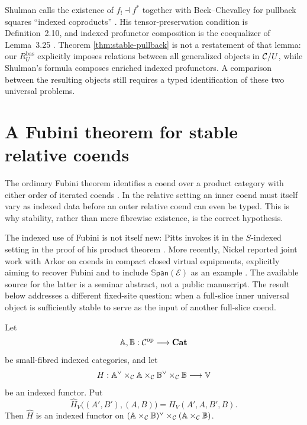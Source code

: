\begin{remark}
\label{rem:shulman-boundary}
Shulman calls the existence of \(f_!\dashv f^*\) together with
Beck--Chevalley for pullback squares ``indexed coproducts''
\cite[Definition~2.4, p.~7]{Shulman2013}.  His tensor-preservation condition
is Definition~2.10, and indexed profunctor composition is the coequalizer of
Lemma~3.25 \cite[pp.~8 and 21--22]{Shulman2013}.  Theorem
\ref{thm:stable-pullback} is not a restatement of that lemma: our
\(R_U^{\mathrm{bas}}\) explicitly imposes relations between all generalized
objects in \(\mathcal{C}/U\), while Shulman's formula composes enriched indexed
profunctors.  A comparison between the resulting objects still requires a
typed identification of these two universal problems.
\end{remark}


\section{A Fubini theorem for stable relative coends}
\label{sec:relative-fubini}

The ordinary Fubini theorem identifies a coend over a product category with
either order of iterated coends
\cite[Theorem~1.3.1, pp.~37--39]{Loregian2023}.  In the relative setting an
inner coend must itself vary as indexed data before an outer relative coend
can even be typed.  This is why stability, rather than mere fibrewise
existence, is the correct hypothesis.

The indexed use of Fubini is not itself new: Pitts invokes it in the
\(S\)-indexed setting in the proof of his product theorem
\cite[proof of Theorem~2.3, p.~51]{Pitts1985}.  More recently, Nickel
reported joint work with Arkor on coends in compact closed virtual
equipments, explicitly aiming to recover Fubini and to include
\(\mathbb{S}\mathsf{pan}(\mathcal E)\) as an example
\cite{NickelArkor2026}.  The available source for the latter is a seminar
abstract, not a public manuscript.  The result below addresses a different
fixed-site question: when a full-slice inner universal object is sufficiently
stable to serve as the input of another full-slice coend.

Let
\[
  \mathbb A,\mathbb B:\mathcal{C}^{\mathrm{op}}\longrightarrow\mathbf{Cat}
\]
be small-fibred indexed categories, and let
\begin{equation}
  H:\mathbb A^{\vee}\times_{\mathcal{C}}\mathbb A
       \times_{\mathcal{C}}\mathbb B^{\vee}\times_{\mathcal{C}}\mathbb B
       \longrightarrow\mathbb{V}
  \label{eq:four-variable-H}
\end{equation}
be an indexed functor.  Put
\[
  \widehat H_V\bigl((A',B'),(A,B)\bigr)
  =H_V(A',A,B',B).
\]
Then \(\widehat H\) is an indexed functor on
\((\mathbb A\times_{\mathcal{C}}\mathbb B)^{\vee}
 \times_{\mathcal{C}}(\mathbb A\times_{\mathcal{C}}\mathbb B)\).

